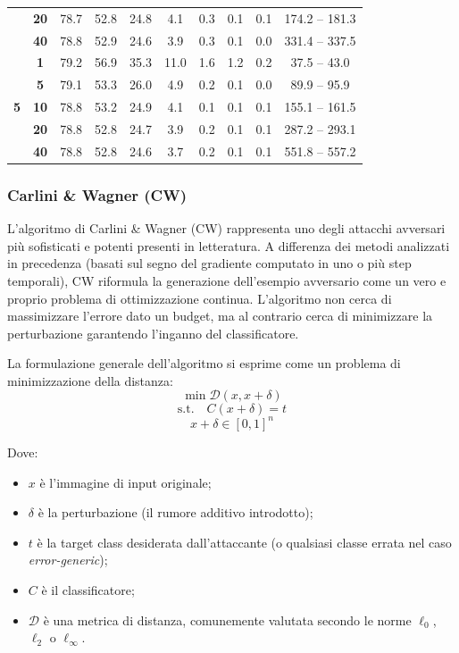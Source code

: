\documentclass[a4paper, 12pt]{article}
\begin{document}
\begin{table}[H]
{\begin{tabular}{cc ccccccc c}
         & \textbf{20} & 78.7 & 52.8 & 24.8 & 4.1  & 0.3 & 0.1 & 0.1 & 174.2 -- 181.3 \\
         & \textbf{40} & 78.8 & 52.9 & 24.6 & 3.9  & 0.3 & 0.1 & 0.0 & 331.4 -- 337.5 \\
        \midrule
        \multirow{5}{*}{\textbf{5}} 
         & \textbf{1}  & 79.2 & 56.9 & 35.3 & 11.0 & 1.6 & 1.2 & 0.2 & 37.5 -- 43.0 \\
         & \textbf{5}  & 79.1 & 53.3 & 26.0 & 4.9  & 0.2 & 0.1 & 0.0 & 89.9 -- 95.9 \\
         & \textbf{10} & 78.8 & 53.2 & 24.9 & 4.1  & 0.1 & 0.1 & 0.1 & 155.1 -- 161.5 \\
         & \textbf{20} & 78.8 & 52.8 & 24.7 & 3.9  & 0.2 & 0.1 & 0.1 & 287.2 -- 293.1 \\
         & \textbf{40} & 78.8 & 52.8 & 24.6 & 3.7  & 0.2 & 0.1 & 0.1 & 551.8 -- 557.2 \\
        \bottomrule
    \end{tabular}
    } %
\end{table}

\vspace{10pt}

\subsubsection{Carlini \& Wagner (CW)}
L'algoritmo di Carlini \& Wagner (CW) rappresenta uno degli attacchi avversari più sofisticati e potenti presenti in letteratura. A differenza dei metodi analizzati in precedenza (basati sul segno del gradiente computato in uno o più step temporali), CW riformula la generazione dell'esempio avversario come un vero e proprio problema di ottimizzazione continua. L'algoritmo non cerca di massimizzare l'errore dato un budget, ma al contrario cerca di minimizzare la perturbazione garantendo l'inganno del classificatore.

La formulazione generale dell'algoritmo si esprime come un problema di minimizzazione della distanza:
$$ \min \mathcal{D}(x, x + \delta) $$
$$ \text{s.t.} \quad C(x + \delta) = t $$
$$ x + \delta \in [0, 1]^n $$

Dove:
\begin{itemize}
    \item $x$ è l'immagine di input originale;
    \item $\delta$ è la perturbazione (il rumore additivo introdotto);
    \item $t$ è la target class desiderata dall'attaccante (o qualsiasi classe errata nel caso \textit{error-generic});
    \item $C$ è il classificatore;
    \item $\mathcal{D}$ è una metrica di distanza, comunemente valutata secondo le norme $\ell_0$, $\ell_2$ o $\ell_\infty$.
\end{itemize}
\end{document}
